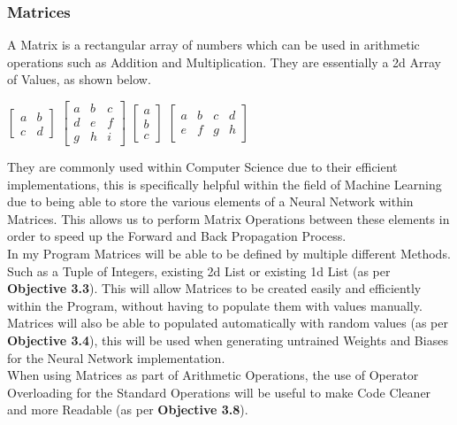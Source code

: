 \begin{flushleft}
            \subsubsection{Matrices}
                A Matrix is a rectangular array of numbers which can be used in arithmetic operations such as Addition and Multiplication.
                They are essentially a 2d Array of Values, as shown below. \\
                \begin{center}
                    $\begin{bmatrix}
                        a & b\\
                        c & d
                    \end{bmatrix}$ 
                    $\begin{bmatrix}
                        a & b & c \\
                        d & e & f \\
                        g & h & i 
                    \end{bmatrix}$ 
                    $\begin{bmatrix}
                        a \\
                        b \\
                        c  
                    \end{bmatrix}$ 
                    $\begin{bmatrix}
                        a & b & c & d\\
                        e & f & g & h
                    \end{bmatrix}$ 
                \end{center}    
                They are commonly used within Computer Science due to their efficient implementations, this is specifically helpful
                within the field of Machine Learning due to being able to store the various elements of a Neural Network within Matrices.
                This allows us to perform Matrix Operations between these elements in order to speed up the Forward and Back Propagation 
                Process. \\
                \vspace{0.2cm}
                In my Program Matrices will be able to be defined by multiple different Methods. Such as a Tuple of Integers, existing 2d
                List or existing 1d List (as per \textbf{Objective 3.3}). This will allow Matrices to be created easily and efficiently
                within the Program, without having to populate them with values manually. Matrices will also be able to populated automatically
                with random values (as per \textbf{Objective 3.4}), this will be used when generating untrained Weights and Biases for the 
                Neural Network implementation. \\
                \vspace{0.2cm}
                When using Matrices as part of Arithmetic Operations, the use of Operator Overloading for the Standard Operations will be
                useful to make Code Cleaner and more Readable (as per \textbf{Objective 3.8}).

\end{flushleft}
